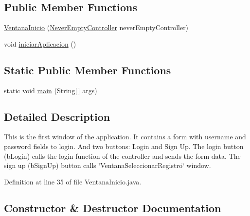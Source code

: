 \subsection*{Public Member Functions}
\begin{DoxyCompactItemize}
\item 
\mbox{\hyperlink{class_s_p_q_1_1gui_1_1_ventana_inicio_ab74166cbe23810e4b8586849fb86b54e}{Ventana\+Inicio}} (\mbox{\hyperlink{class_s_p_q_1_1controller_1_1_never_empty_controller}{Never\+Empty\+Controller}} never\+Empty\+Controller)
\item 
void \mbox{\hyperlink{class_s_p_q_1_1gui_1_1_ventana_inicio_a0588d157580852e153c5dd2291645173}{iniciar\+Aplicacion}} ()
\end{DoxyCompactItemize}
\subsection*{Static Public Member Functions}
\begin{DoxyCompactItemize}
\item 
static void \mbox{\hyperlink{class_s_p_q_1_1gui_1_1_ventana_inicio_ab33d2c349f8f7475d2d6833e9bf75e76}{main}} (String\mbox{[}$\,$\mbox{]} args)
\end{DoxyCompactItemize}


\subsection{Detailed Description}
This is the first window of the application. It contains a form with username and password fields to login. And two buttons\+: Login and Sign Up. The login button (b\+Login) calls the login function of the controller and sends the form data. The sign up (b\+Sign\+Up) button calls \char`\"{}\+Ventana\+Seleccionar\+Registro\char`\"{} window. 

Definition at line 35 of file Ventana\+Inicio.\+java.



\subsection{Constructor \& Destructor Documentation}
\mbox{\label{class_s_p_q_1_1gui_1_1_ventana_inicio_ab74166cbe23810e4b8586849fb86b54e}} 
